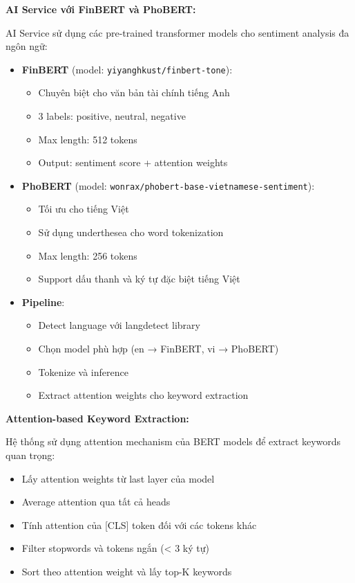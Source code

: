 \noindent\textbf{AI Service với FinBERT và PhoBERT:}

AI Service sử dụng các pre-trained transformer models cho sentiment analysis đa ngôn ngữ:

\begin{itemize}
    \item \textbf{FinBERT} (model: \texttt{yiyanghkust/finbert-tone}):
    \begin{itemize}
        \item Chuyên biệt cho văn bản tài chính tiếng Anh
        \item 3 labels: positive, neutral, negative
        \item Max length: 512 tokens
        \item Output: sentiment score + attention weights
    \end{itemize}
    
    \item \textbf{PhoBERT} (model: \texttt{wonrax/phobert-base-vietnamese-sentiment}):
    \begin{itemize}
        \item Tối ưu cho tiếng Việt
        \item Sử dụng underthesea cho word tokenization
        \item Max length: 256 tokens
        \item Support dấu thanh và ký tự đặc biệt tiếng Việt
    \end{itemize}
    
    \item \textbf{Pipeline}:
    \begin{itemize}
        \item Detect language với langdetect library
        \item Chọn model phù hợp (en → FinBERT, vi → PhoBERT)
        \item Tokenize và inference
        \item Extract attention weights cho keyword extraction
    \end{itemize}
\end{itemize}

\noindent\textbf{Attention-based Keyword Extraction:}

Hệ thống sử dụng attention mechanism của BERT models để extract keywords quan trọng:

\begin{itemize}
    \item Lấy attention weights từ last layer của model
    \item Average attention qua tất cả heads
    \item Tính attention của [CLS] token đối với các tokens khác
    \item Filter stopwords và tokens ngắn (< 3 ký tự)
    \item Sort theo attention weight và lấy top-K keywords
\end{itemize}

